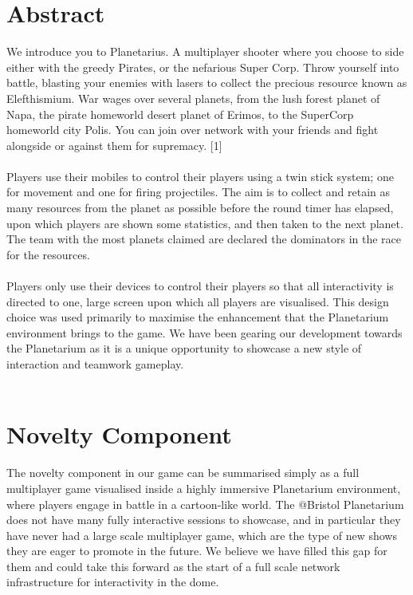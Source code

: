 \documentclass[11pt,a4paper]{article}
\begin{document}
\pagebreak
\tableofcontents

\pagebreak

\section{Abstract}

We introduce you to Planetarius. A multiplayer shooter where you choose to side either with the greedy Pirates, or the nefarious Super Corp. Throw yourself into battle, blasting your enemies with lasers to collect the precious resource known as Elefthismium. War wages over several planets, from the lush forest planet of Napa, the pirate homeworld desert planet of Erimos, to the SuperCorp homeworld city Polis. You can join over network with your friends and fight alongside or against them for supremacy. [1] \\ \\
Players use their mobiles to control their players using a twin stick system; one for movement and one for firing projectiles. The aim is to collect and retain as many resources from the planet as possible before the round timer has elapsed, upon which players are shown some statistics, and then taken to the next planet. The team with the most planets claimed are declared the dominators in the race for the resources. \\ \\
Players only use their devices to control their players so that all interactivity is directed to one, large screen upon which all players are visualised. This design choice was used primarily to maximise the enhancement that the Planetarium environment brings to the game. We have been gearing our development towards the Planetarium as it is a unique opportunity to showcase a new style of interaction and teamwork gameplay. \\ \\


\section{Novelty Component}

\noindent
 The novelty component in our game can be summarised simply as a full multiplayer game visualised inside a highly immersive Planetarium environment, where players engage in battle in a cartoon-like world. The @Bristol Planetarium does not have many fully interactive sessions to showcase, and in particular they have never had a large scale multiplayer game, which are the type of new shows they are eager to promote in the future. We believe we have filled this gap for them and could take this forward as the start of a full scale network infrastructure for interactivity in the dome. \\ \\
\end{document}
